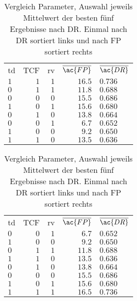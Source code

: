     \begin{table}[ht]
        \parbox{.45\linewidth}{\centering
            \begin{tabular}{lrrrl}
                \hline
                \rowcolor{GruvGray!36}
                \multicolumn{5}{c}{Sortiert nach $\overline{\ac{DR}}$}\\
                \hline
                td  & \ac{TCF} & rv & $\overline{\ac{FP}}$ & $\overline{\ac{DR}}$ \\
                \toprule
                \rowcolor{GruvGray!16}
                $1$ & $1$ & $1$ & $16.5$ & $0.736$ \\
                $0$ & $1$ & $1$ & $11.8$ & $0.688$ \\
                \rowcolor{GruvGray!16}
                $0$ & $0$ & $0$ & $15.5$ & $0.686$ \\
                $1$ & $0$ & $1$ & $15.6$ & $0.680$ \\
                \rowcolor{GruvGray!16}
                $0$ & $1$ & $0$ & $13.8$ & $0.664$ \\
                $0$ & $0$ & $1$ & $6.7$ & $0.652$ \\
                \rowcolor{GruvGray!16}
                $1$ & $0$ & $0$ & $9.2$ & $0.650$ \\
                $1$ & $1$ & $0$ & $13.5$ & $0.636$ \\
                \hline
            \end{tabular}}
        \hfill
        \parbox{.45\linewidth}{\centering
            \begin{tabular}{lrrrl}
                \hline
                \rowcolor{GruvGray!36}
                \multicolumn{5}{c}{Sortiert nach $\overline{\ac{FP}}$}\\
                \hline
                td  & \ac{TCF} & rv & $\overline{\ac{FP}}$ & $\overline{\ac{DR}}$ \\
                \toprule
                \rowcolor{GruvGray!16}
                $0$ & $0$ & $1$ & $6.7$ & $0.652$ \\
                $1$ & $0$ & $0$ & $9.2$ & $0.650$ \\
                \rowcolor{GruvGray!16}
                $0$ & $1$ & $1$ & $11.8$ & $0.688$ \\
                $1$ & $1$ & $0$ & $13.5$ & $0.636$ \\
                \rowcolor{GruvGray!16}
                $0$ & $1$ & $0$ & $13.8$ & $0.664$ \\
                $0$ & $0$ & $0$ & $15.5$ & $0.686$ \\
                \rowcolor{GruvGray!16}
                $1$ & $0$ & $1$ & $15.6$ & $0.680$ \\
                $1$ & $1$ & $1$ & $16.5$ & $0.736$ \\
                \hline
            \end{tabular}}
        \caption[Parameter Vergleich]{Vergleich Parameter, Auswahl jeweils Mittelwert der besten fünf Ergebnisse nach \ac{DR}. Einmal nach \ac{DR} sortiert links und nach \ac{FP} sortiert rechts}
        \label{tab:LSTM_para_vgl}
    \end{table}
    \fi


